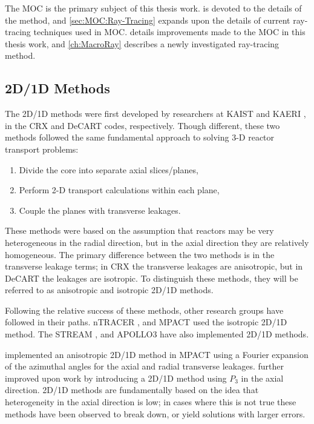 {{{      The \ac{MOC} is the primary subject of this thesis work.
       is devoted to the details of the method, and \cref{sec:MOC:Ray-Tracing} expands upon the details of current ray-tracing techniques used in \ac{MOC}.
       details improvements made to the \ac{MOC} in this thesis work, and \cref{ch:MacroRay} describes a newly investigated ray-tracing method.
    }

    
    
    

    \subsection{2D/1D Methods}{\label{ssec:3T:2D/1D Methods}
      The 2D/1D methods were first developed by researchers at \ac{KAIST} \cite{Cho2002} and \ac{KAERI} \cite{DeCART}, in the CRX and DeCART codes, respectively.
      Though different, these two methods followed the same fundamental approach to solving 3-D reactor transport problems:
      \begin{enumerate}
        \item{Divide the core into separate axial slices/planes,}
        \item{Perform 2-D transport calculations within each plane,}
        \item{Couple the planes with transverse leakages.}
      \end{enumerate}
      These methods were based on the assumption that reactors may be very heterogeneous in the radial direction, but in the axial direction they are relatively homogeneous.
      The primary difference between the two methods is in the transverse leakage terms; in CRX the transverse leakages are anisotropic, but in DeCART the leakages are isotropic.
      To distinguish these methods, they will be referred to as anisotropic and isotropic 2D/1D methods.

      Following the relative success of these methods, other research groups have followed in their paths.
      nTRACER \cite{Jung2009}, and MPACT \cite{MPACT2016} used the isotropic 2D/1D method.
      The STREAM \cite{Zheng2017}, and APOLLO3 \cite{Faure2018} have also implemented 2D/1D methods.

      \citet{Stimpson2015} implemented an anisotropic 2D/1D method in MPACT using a Fourier expansion of the azimuthal angles for the axial and radial transverse leakages.
      \citet{Jarrett2018} further improved upon  work by introducing a 2D/1D method using $P_3$ in the axial direction.
      2D/1D methods are fundamentally based on the idea that heterogeneity in the axial direction is low;
      in cases where this is not true these methods have been observed to break down, or yield solutions with larger errors.

}}}
